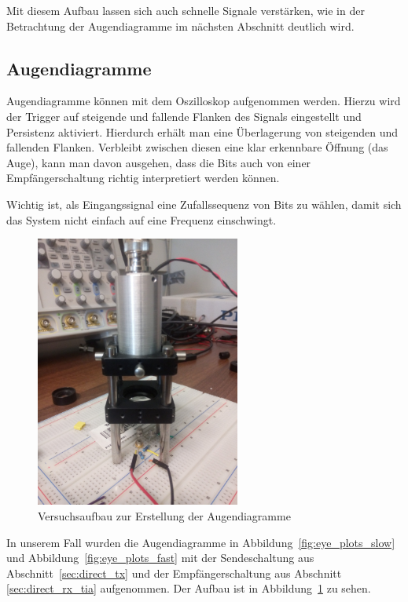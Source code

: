 \documentclass[12pt,a4paper]{article}
\begin{document}
Mit diesem Aufbau lassen sich auch schnelle Signale verstärken, wie in der Betrachtung der Augendiagramme im nächsten Abschnitt deutlich wird.


\subsection{Augendiagramme}
\label{sec:eye_diag}
Augendiagramme können mit dem Oszilloskop aufgenommen werden. Hierzu wird der Trigger auf steigende und fallende Flanken des Signals eingestellt und Persistenz aktiviert. Hierdurch erhält man eine Überlagerung von steigenden und fallenden Flanken. Verbleibt zwischen diesen eine klar erkennbare Öffnung (das Auge), kann man davon ausgehen, dass die Bits auch von einer Empfängerschaltung richtig interpretiert werden können.

Wichtig ist, als Eingangssignal eine Zufallssequenz von Bits zu wählen, damit sich das System nicht einfach auf eine Frequenz einschwingt.

\begin{figure}[H]
  \centering
    \includegraphics[width=0.6\textwidth]{../photos/IMG_20140710_184030.jpg}
  \caption{Versuchsaufbau zur Erstellung der Augendiagramme}
  \label{fig:eye_setup}
\end{figure}

In unserem Fall wurden die Augendiagramme in Abbildung~\ref{fig:eye_plots_slow} und Abbildung~\ref{fig:eye_plots_fast} mit der Sendeschaltung aus Abschnitt~\ref{sec:direct_tx} und der Empfängerschaltung aus Abschnitt \ref{sec:direct_rx_tia} aufgenommen. Der Aufbau ist in Abbildung~\ref{fig:eye_setup} zu sehen.
\end{document}
